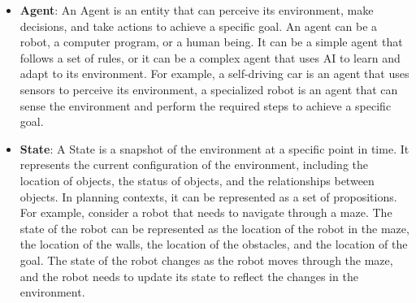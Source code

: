 \begin{itemize}
      \item \textbf{Agent}: An Agent is an entity that can perceive its environment, make decisions, and take actions to achieve a specific goal. An agent can be a robot, a computer program, or a human being. It can be a simple agent that follows a set of rules, or it can be a complex agent that uses \ac{AI} to learn and adapt to its environment. For example, a self-driving car is an agent that uses sensors to perceive its environment, a specialized robot is an agent that can sense the environment and perform the required steps to achieve a specific goal.

      \item \textbf{State}: A State is a snapshot of the environment at a specific point in time. It represents the current configuration of the environment, including the location of objects, the status of objects, and the relationships between objects. In planning contexts, it can be represented as a set of propositions. For example, consider a robot that needs to navigate through a maze. The state of the robot can be represented as the location of the robot in the maze, the location of the walls, the location of the obstacles, and the location of the goal. The state of the robot changes as the robot moves through the maze, and the robot needs to update its state to reflect the changes in the environment.


\end{itemize}
